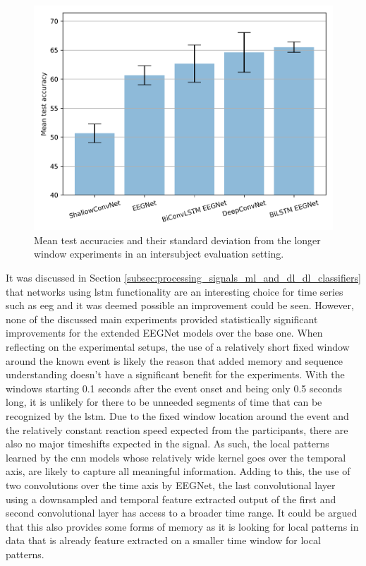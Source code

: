 \begin{figure}[ht]
    \centering
    \includegraphics[width=0.5\linewidth]{../images/results/new_subject_longer_window.pdf}
    \captionsetup{width=\linewidth}
    \captionsetup{justification=centering}
    \caption{Mean test accuracies and their standard deviation from the longer window experiments in an intersubject evaluation setting.} 
    \label{fig:results_intersubject_long_bar}
\end{figure}

It was discussed in Section \ref{subsec:processing_signals_ml_and_dl_dl_classifiers} that networks using \gls{lstm} functionality are an interesting choice for time series such as \gls{eeg} and it was deemed possible an improvement could be seen.
However, none of the discussed main experiments provided statistically significant improvements for the extended EEGNet models over the base one.
When reflecting on the experimental setups, the use of a relatively short fixed window around the known event is likely the reason that added memory and sequence understanding doesn't have a significant benefit for the experiments.
With the windows starting 0.1 seconds after the event onset and being only 0.5 seconds long, it is unlikely for there to be unneeded segments of time that can be recognized by the \gls{lstm}.
Due to the fixed window location around the event and the relatively constant reaction speed expected from the participants, there are also no major timeshifts expected in the signal.
As such, the local patterns learned by the \gls{cnn} models whose relatively wide kernel goes over the temporal axis, are likely to capture all meaningful information.
Adding to this, the use of two convolutions over the time axis by EEGNet, the last convolutional layer using a downsampled and temporal feature extracted output of the first and second convolutional layer has access to a broader time range.
It could be argued that this also provides some forms of memory as it is looking for local patterns in data that is already feature extracted on a smaller time window for local patterns.

